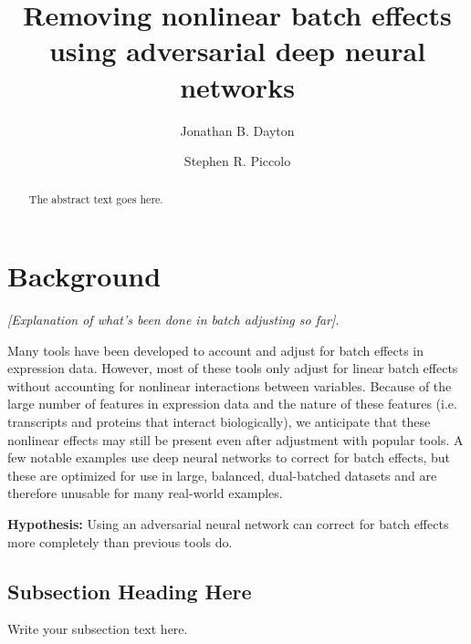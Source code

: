 \documentclass[titlepage]{article}
\begin{document}
\title{Removing nonlinear batch effects using adversarial deep neural networks}
\author[1]{Jonathan B. Dayton}
\author[1]{Stephen R. Piccolo}

\maketitle

\begin{abstract}
	The abstract text goes here.
\end{abstract}

\section{Background}

\emph{[Explanation of what's been done in batch adjusting so far].}

Many tools have been developed to account and adjust for batch effects in expression data.
However, most of these tools only adjust for linear batch effects without accounting for nonlinear interactions between variables.
Because of the large number of features in expression data and the nature of these features (i.e. transcripts and proteins that interact biologically), we anticipate that these nonlinear effects may still be present even after adjustment with popular tools.
A few notable examples use deep neural networks to correct for batch effects, but these are optimized for use in large, balanced, dual-batched datasets and are therefore unusable for many real-world examples.

\textbf{Hypothesis:}
Using an adversarial neural network can correct for batch effects more completely than previous tools do. %

\subsection{Subsection Heading Here}
Write your subsection text here.
\end{document}
